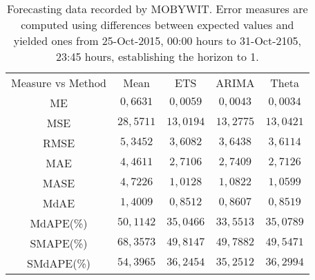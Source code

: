 \begin{table}
{\scriptsize
\centering
\begin{tabular}{|c|c|c|c|c|}
\hline
Measure vs Method &Mean &ETS &ARIMA &Theta\\
ME &$0,6631$ & $0,0059$ & $0,0043$ & \textbf{$0,0034$}\\
MSE &$28,5711$ & \textbf{$13,0194$} & $13,2775$ & $13,0421$\\
RMSE &$5,3452$ & \textbf{$3,6082$} & $3,6438$ & $3,6114$\\
MAE &$4,4611$ & \textbf{$2,7106$} & $2,7409$ & $2,7126$\\
MASE &$4,7226$ & \textbf{$1,0128$} & $1,0822$ & $1,0599$\\
MdAE &$1,4009$ & \textbf{$0,8512$} & $0,8607$ & $0,8519$\\
MdAPE(\%) &$50,1142$ & $35,0466$ & \textbf{$33,5513$} & $35,0789$\\
 SMAPE(\%) &$68,3573$ & $49,8147$ & $49,7882$ & \textbf{$49,5471$}\\
 SMdAPE(\%) &$54,3965$ & $36,2454$ & \textbf{$35,2512$} & $36,2994$\\

\hline
\end{tabular}
}
\caption{Forecasting data recorded by MOBYWIT. Error measures are computed using differences between expected values and yielded ones from 25-Oct-2015, 00:00 hours to 31-Oct-2105, 23:45 hours, establishing the horizon to 1.}
\label{tab:forecasting}
\end{table}
